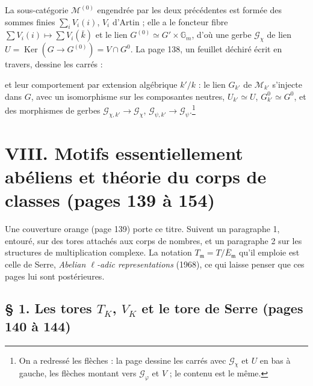 \documentclass[11pt,a4paper]{article}
\begin{document}
La sous-catégorie $\mathcal{M}^{(0)}$ engendrée par les deux précédentes est
formée des sommes finies $\sum_{i} V_{i}(i)$, $V_{i}$ d'Artin ; elle a le
foncteur fibre $\sum V_{i}(i) \mapsto \sum V_{i}(\bar{k})$ et le lien $G^{(0)}
\simeq G' \times \mathbb{G}_{m}$, d'où une gerbe $\mathcal{G}_{\chi}$ de lien $U =
\operatorname{Ker}(G \to G^{(0)}) = V \cap G^{0}$. La page 138, un feuillet
déchiré écrit en travers, dessine les carrés :



et leur comportement par extension algébrique $k'/k$ : le lien $G_{k'}$ de
$\mathcal{M}_{k'}$ s'injecte dans $G$, avec un isomorphisme sur les composantes
neutres, $U_{k'} \simeq U$, $G^{0}_{k'} \simeq G^{0}$, et des morphismes de
gerbes $\mathcal{G}_{\chi, k'} \to \mathcal{G}_{\chi}$, $\mathcal{G}_{\psi, k'}
\to \mathcal{G}_{\psi}$.\footnote{On a redressé les flèches : la page dessine les
carrés avec $\mathcal{G}_{\chi}$ et $U$ en bas à gauche, les flèches montant vers
$\mathcal{G}_{\varphi}$ et $V$ ; le contenu est le même.}

\section*{VIII. Motifs essentiellement abéliens et théorie du corps de classes (pages 139 à 154)}

Une couverture orange (page 139) porte ce titre. Suivent un paragraphe 1,
entouré, sur des tores attachés aux corps de nombres, et un paragraphe 2 sur les
structures de multiplication complexe. La notation $T_{\mathfrak{m}} =
T/\overline{E}_{\mathfrak{m}}$ qu'il emploie est celle de Serre, \emph{Abelian
$\ell$-adic representations} (1968), ce qui laisse penser que ces pages lui sont
postérieures.

\subsection*{§ 1. Les tores $T_{K}$, $V_{K}$ et le tore de Serre (pages 140 à 144)}
\end{document}
